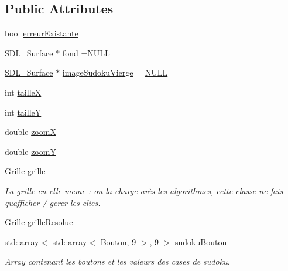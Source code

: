 \subsection*{Public Attributes}
\begin{DoxyCompactItemize}
\item 
bool \hyperlink{class_grille_graphique_a56518a83cba80e34d60133a50bad30e2}{erreur\+Existante}
\item 
\hyperlink{struct_s_d_l___surface}{S\+D\+L\+\_\+\+Surface} $\ast$ \hyperlink{class_grille_graphique_a3a161cd8377578a6f4dc1b5d234cb090}{fond} =\hyperlink{begin__code_8h_a070d2ce7b6bb7e5c05602aa8c308d0c4}{N\+U\+L\+L}
\item 
\hyperlink{struct_s_d_l___surface}{S\+D\+L\+\_\+\+Surface} $\ast$ \hyperlink{class_grille_graphique_aac3927bfac4f3677b01e5ebf30fb4280}{image\+Sudoku\+Vierge} = \hyperlink{begin__code_8h_a070d2ce7b6bb7e5c05602aa8c308d0c4}{N\+U\+L\+L}
\item 
int \hyperlink{class_grille_graphique_a405f912724d23fe62af6002de6786650}{taille\+X}
\item 
int \hyperlink{class_grille_graphique_a02037911fa5a2a342b3f90a15ad8d493}{taille\+Y}
\item 
double \hyperlink{class_grille_graphique_ab9d6cb5ea86ad3ebd816a44fabda13bb}{zoom\+X}
\item 
double \hyperlink{class_grille_graphique_a24be5b0794bbb43e645a6ea562740d9c}{zoom\+Y}
\item 
\hyperlink{class_grille}{Grille} \hyperlink{class_grille_graphique_a8577c2dd3bbfc9b58bfd88adcf484eb3}{grille}
\begin{DoxyCompactList}\small\item\em La grille en elle meme \+: on la charge arès les algorithmes, cette classe ne fais qu\textquotesingle{}afficher / gerer les clics. \end{DoxyCompactList}\item 
\hyperlink{class_grille}{Grille} \hyperlink{class_grille_graphique_a0a784721612498e233906223293697c9}{grille\+Resolue}
\item 
std\+::array$<$ std\+::array$<$ \hyperlink{class_bouton}{Bouton}, 9 $>$, 9 $>$ \hyperlink{class_grille_graphique_a19ac32327d22811a2e2cdbaf93286b06}{sudoku\+Bouton}
\begin{DoxyCompactList}\small\item\em Array contenant les boutons et les valeurs des cases de sudoku. \end{DoxyCompactList}\end{DoxyCompactItemize}


